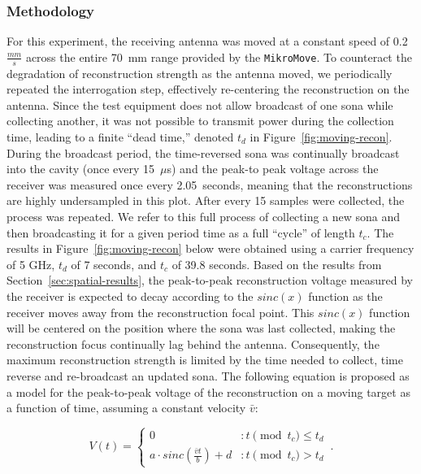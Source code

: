 \subsubsection{Methodology}
For this experiment, the receiving antenna was moved at a constant speed of 0.2~$\frac{mm}{s}$ across the entire 70~mm range provided by the \texttt{MikroMove}. To counteract the degradation of reconstruction strength as the antenna moved, we periodically repeated the interrogation step, effectively re-centering the reconstruction on the antenna. Since the test equipment does not allow broadcast of one sona while collecting another, it was not possible to transmit power during the collection time, leading to a finite ``dead time,'' denoted $t_d$ in Figure~\ref{fig:moving-recon}. During the broadcast period, the time-reversed sona was continually broadcast into the cavity (once every 15~$\mu$s) and the peak-to peak voltage across the receiver was measured once every 2.05~seconds, meaning that the reconstructions are highly undersampled in this plot. After every 15 samples were collected, the process was repeated. We refer to this full process of collecting a new sona and then broadcasting it for a given period time as a full ``cycle'' of length $t_c$. The results in Figure~\ref{fig:moving-recon}  below were obtained using a carrier frequency of 5 GHz, $t_d$ of 7 seconds, and $t_c$ of 39.8 seconds. Based on the results from Section~\ref{sec:spatial-results}, the peak-to-peak reconstruction voltage measured by the receiver is expected to decay according to the $sinc(x)$ function as the receiver
moves away from the reconstruction focal point. This $sinc(x)$ function will be centered on the position where the sona was last collected, making the reconstruction focus continually lag behind the antenna. Consequently, the maximum reconstruction strength is limited by the time needed to collect, time reverse and re-broadcast an updated sona. The following equation is proposed as a model for the peak-to-peak voltage of the reconstruction on a moving target as a
function of time, assuming a constant velocity $\bar{v}$:

\begin{equation}\label{eq:vt}
  V(t) = \left\{
        \begin{array}{ll}
                0 & : t\pmod{t_c} \le t_d \\
                a\cdot sinc(\frac{\bar{v}t}{b})+d & : t\pmod{t_c} > t_d
        \end{array}\,.
  \right.
\end{equation}


